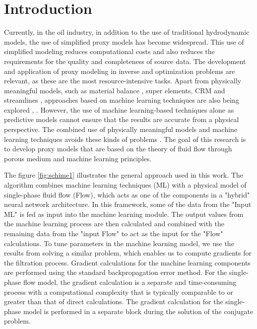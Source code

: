\documentclass[
11pt,%
tightenlines,%
twoside,%
onecolumn,%
nofloats,%
nobibnotes,%
nofootinbib,%
superscriptaddress,%
noshowpacs,%
centertags]%
{revtex4}
\begin{document}


\maketitle


\section{Introduction}
Currently, in the oil industry, in addition to the use of traditional hydrodynamic models, the use of simplified proxy models has become widespread. This use of simplified modeling reduces computational costs and also reduces the requirements for the quality and completeness of source data. The development and application of proxy modeling in inverse and optimization problems are relevant, as these are the most resource-intensive tasks. Apart from physically meaningful models, such as material balance \cite{mus1}, super elements, CRM \cite{bek} and streamlines \cite{pot}, approaches based on machine learning techniques are also being explored  \cite{tem}, \cite{uma}. However, the use of machine learning-based techniques alone as predictive models cannot ensure that the results are accurate from a physical perspective. The combined use of physically meaningful models and machine learning techniques avoids these kinds of problems \cite{kos2}. The goal of this research is to develop proxy models that are based on the theory of fluid flow through porous medium and machine learning principles. 

The figure \ref{fig:schime1} illustrates the general approach used in this work. The algorithm combines machine learning techniques (ML) with a physical model of single-phase fluid flow (Flow), which acts as one of the components in a "hybrid" neural network architecture. In this framework, some of the data from the "Input ML" is fed as input into the machine learning module. The output values from the machine learning process are then calculated and combined with the remaining data from the "input Flow" to act as the input for the "Flow" calculations. To tune parameters in the machine learning model, we use the results from solving a similar problem, which enables us to compute gradients for the filtration process. Gradient calculations for the machine learning components are performed using the standard backpropagation error method. For the single-phase flow model, the gradient calculation is a separate and time-consuming process with a computational complexity that is typically comparable to or greater than that of direct calculations. The gradient calculation for the single-phase model is performed in a separate block during the solution of the conjugate problem.
\end{document}
